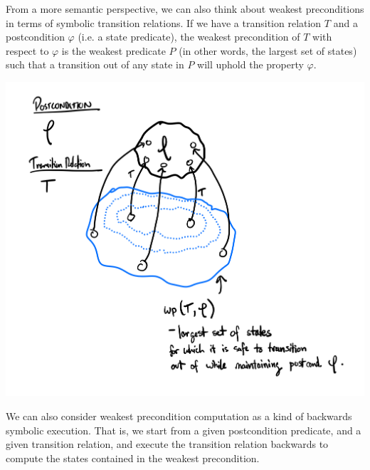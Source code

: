 \documentclass[10pt,a4paper]{article}
\begin{document}
From a more semantic perspective, we can also think about weakest preconditions in terms of symbolic transition relations. If we have a transition relation $T$ and a postcondition $\varphi$ (i.e. a state predicate), the weakest precondition of $T$ with respect to $\varphi$ is the weakest predicate $P$ (in other words, the largest set of states) such that a transition out of any state in $P$ will uphold the property $\varphi$.
\begin{center}
    \includegraphics[scale=0.18]{weakest_precond.png}
\end{center}
We can also consider weakest precondition computation as a kind of backwards symbolic execution. That is, we start from a given postcondition predicate, and a given transition relation, and execute the transition relation backwards to compute the states contained in the weakest precondition.




\end{document}
